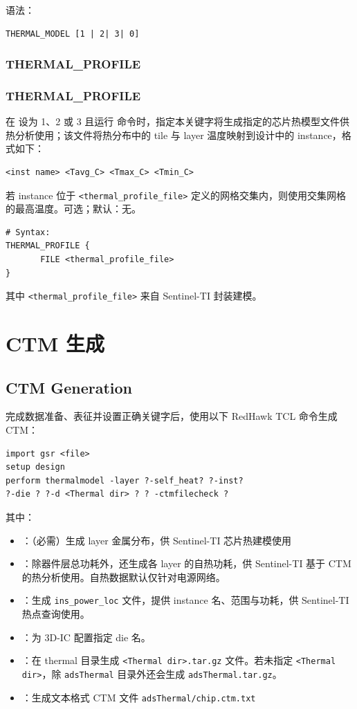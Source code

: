 语法：
\begin{lstlisting}
THERMAL_MODEL [1 | 2| 3| 0]
\end{lstlisting}

\subsubsection{THERMAL\_PROFILE}
\subsubsection*{THERMAL\_PROFILE}

在  设为 1、2 或 3 且运行  命令时，指定本关键字将生成指定的芯片热模型文件供热分析使用；该文件将热分布中的 tile 与 layer 温度映射到设计中的 instance，格式如下：
\begin{lstlisting}
<inst name> <Tavg_C> <Tmax_C> <Tmin_C>
\end{lstlisting}

若 instance 位于 \texttt{<thermal\_profile\_file>} 定义的网格交集内，则使用交集网格的最高温度。可选；默认：无。
\begin{lstlisting}
# Syntax:
THERMAL_PROFILE {
       FILE <thermal_profile_file>
}
\end{lstlisting}
其中 \texttt{<thermal\_profile\_file>} 来自 Sentinel-TI 封装建模。

\section{CTM 生成}
\subsection*{CTM Generation}

完成数据准备、表征并设置正确关键字后，使用以下 RedHawk TCL 命令生成 CTM：
\begin{lstlisting}
import gsr <file>
setup design
perform thermalmodel -layer ?-self_heat? ?-inst?
?-die ? ?-d <Thermal dir> ? ? -ctmfilecheck ?
\end{lstlisting}
其中：
\begin{itemize}
  \item {}：（必需）生成 layer 金属分布，供 Sentinel-TI 芯片热建模使用
  \item {}：除器件层总功耗外，还生成各 layer 的自热功耗，供 Sentinel-TI 基于 CTM 的热分析使用。自热数据默认仅针对电源网络。
  \item {}：生成 \texttt{ins\_power\_loc} 文件，提供 instance 名、范围与功耗，供 Sentinel-TI 热点查询使用。
  \item {}：为 3D-IC 配置指定 die 名。
  \item {}：在 thermal 目录生成 \texttt{<Thermal dir>.tar.gz} 文件。若未指定  \texttt{<Thermal dir>}，除 \texttt{adsThermal} 目录外还会生成 \texttt{adsThermal.tar.gz}。
  \item {}：生成文本格式 CTM 文件 \texttt{adsThermal/chip.ctm.txt}
\end{itemize}

